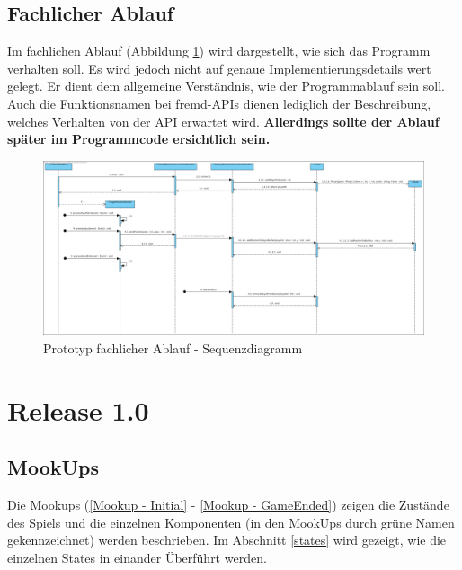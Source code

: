 \subsection{Fachlicher Ablauf}
Im fachlichen Ablauf (Abbildung \ref{Prototyp fachlicher Ablauf - Sequenzdiagramm}) wird dargestellt, wie sich das Programm verhalten soll. Es wird jedoch nicht auf genaue Implementierungsdetails wert gelegt. Er dient dem allgemeine Verständnis, wie der Programmablauf sein soll. Auch die Funktionsnamen bei fremd-APIs dienen lediglich der Beschreibung, welches Verhalten von der API erwartet wird. \textbf{Allerdings sollte der Ablauf später im Programmcode ersichtlich sein.}
\begin{figure}[ht]
	\centering
	\includegraphics[width = 0.9\textheight, angle=270]{architecture/PrototypeSequenceDiagram.png}
	\caption{Prototyp fachlicher Ablauf - Sequenzdiagramm}
	\label{Prototyp fachlicher Ablauf - Sequenzdiagramm}
\end{figure}

\FloatBarrier

\section{Release 1.0}
	\subsection{MookUps} \label{mookups}
		Die Mookups (\ref{Mookup - Initial} - \ref{Mookup - GameEnded}) zeigen die Zustände des Spiels und die einzelnen Komponenten (in den MookUps durch grüne Namen gekennzeichnet) werden beschrieben. Im Abschnitt \ref{states} wird gezeigt, wie die einzelnen States in einander Überführt werden.
